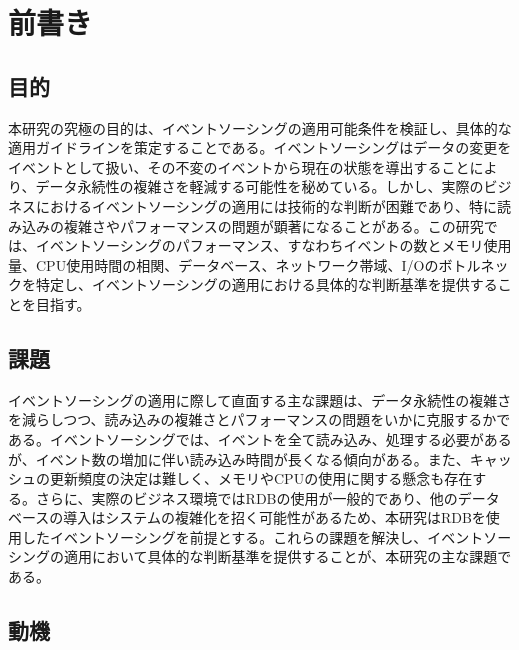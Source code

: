 \documentclass[../../main]{subfiles}
\begin{document}
    \chapter{前書き}\label{ch:preface}

    \section{目的}\label{sec:preface-purpose}

    本研究の究極の目的は、イベントソーシングの適用可能条件を検証し、具体的な適用ガイドラインを策定することである。イベントソーシングはデータの変更をイベントとして扱い、その不変のイベントから現在の状態を導出することにより、データ永続性の複雑さを軽減する可能性を秘めている。しかし、実際のビジネスにおけるイベントソーシングの適用には技術的な判断が困難であり、特に読み込みの複雑さやパフォーマンスの問題が顕著になることがある。この研究では、イベントソーシングのパフォーマンス、すなわちイベントの数とメモリ使用量、CPU使用時間の相関、データベース、ネットワーク帯域、I/Oのボトルネックを特定し、イベントソーシングの適用における具体的な判断基準を提供することを目指す。

    \section{課題}\label{sec:preface-problem}

    イベントソーシングの適用に際して直面する主な課題は、データ永続性の複雑さを減らしつつ、読み込みの複雑さとパフォーマンスの問題をいかに克服するかである。イベントソーシングでは、イベントを全て読み込み、処理する必要があるが、イベント数の増加に伴い読み込み時間が長くなる傾向がある。また、キャッシュの更新頻度の決定は難しく、メモリやCPUの使用に関する懸念も存在する。さらに、実際のビジネス環境ではRDBの使用が一般的であり、他のデータベースの導入はシステムの複雑化を招く可能性があるため、本研究はRDBを使用したイベントソーシングを前提とする。これらの課題を解決し、イベントソーシングの適用において具体的な判断基準を提供することが、本研究の主な課題である。

    \section{動機}\label{sec:preface-motive}
\end{document}
